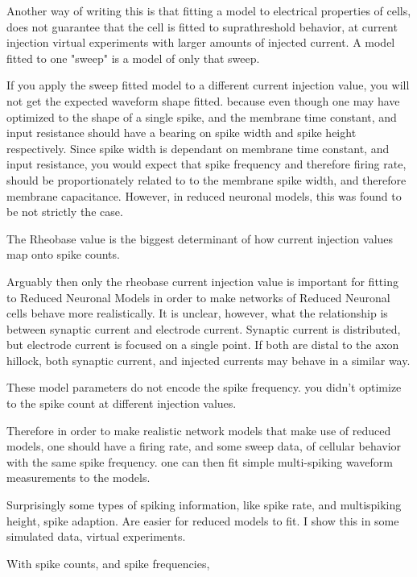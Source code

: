 Another way of writing this is that fitting a model to electrical properties of cells, does not
guarantee that the cell is fitted to suprathreshold behavior, at current injection virtual experiments with larger amounts of injected current.
A model fitted to one "sweep" is a model of only that sweep. 

If you apply the sweep fitted model to a different current injection value, you will not get the expected waveform shape fitted.
because even though one may have optimized to the shape of a single spike, and the membrane time constant, and input resistance should have a bearing
 on spike width and spike height respectively. Since spike width is dependant on membrane time constant, and input resistance, you 
 would expect that spike frequency and therefore firing rate, should be proportionately related to 
 to the membrane spike width, and therefore membrane capacitance. However, in reduced neuronal models, this was found
 to be not strictly the case.

 The Rheobase value is the biggest determinant of how current injection values map onto spike counts.


 Arguably then only the rheobase current injection value is important for fitting to Reduced Neuronal Models in order to make networks of Reduced Neuronal cells behave more realistically.
 It is unclear, however, what the relationship is between synaptic current and electrode current. Synaptic current is distributed, but electrode current is focused on a single point.
 If both are distal to the axon hillock, both synaptic current, and injected currents may behave in a similar way.


 These model parameters do not encode the spike frequency.
you didn't optimize to the spike count at different injection values.

Therefore in order to make realistic network models that make use of reduced models, 
one should have a firing rate, and some sweep data, of cellular behavior with the same spike frequency.
one can then fit simple multi-spiking waveform measurements to the models.

Surprisingly some types of spiking information, like spike rate, and multispiking height, spike adaption.
Are easier for reduced models to fit. I show this in some simulated data, virtual experiments.

With spike counts, and spike frequencies, 
